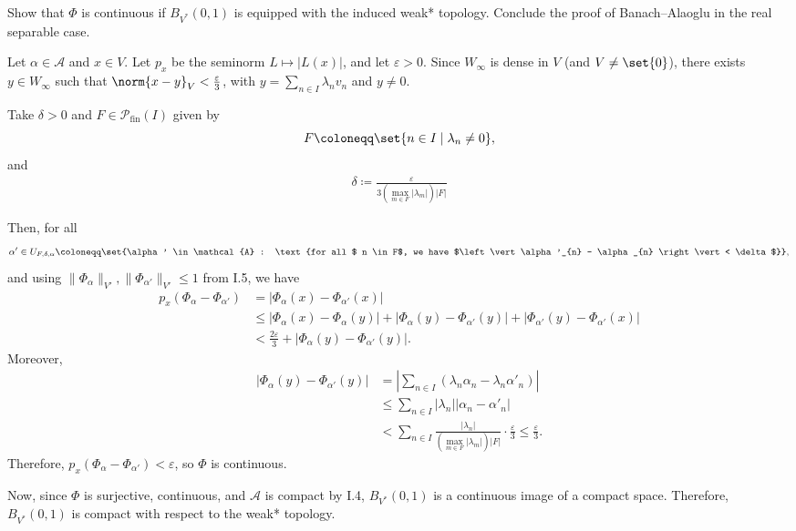\documentclass[10pt]{mypackage}
\renewcommand{\coloneq}{\coloneqq}
\begin{document}
\begin{problem}[Problem I.7]
  Show that $\Phi$ is continuous if $B_{V^{\ast}}\left( 0,1 \right)$ is equipped with the induced weak* topology. Conclude the proof of Banach--Alaoglu in the real separable case.
\end{problem}
\begin{solution}
  Let $\alpha \in \mathcal{A}$ and $x \in V$. Let $p_{x}$ be the seminorm $L \mapsto |L(x)|$, and let $\varepsilon > 0$. Since $W_{\infty}$ is dense in $V$ (and $V \neq \set{0}$), there exists $y \in W_{\infty}$ such that $\norm{x-y}_{V} < \frac{\varepsilon}{3}$, with $y = \sum_{n \in I} \lambda_{n} v_{n}$ and $y \neq 0$.

Take $\delta > 0$ and $F \in \mathcal{P}_{\mathrm{fin}}(I)$ given by
\[
F \coloneq \set{n \in I \mid \lambda_{n} \neq 0},
\]
and 
\begin{align*}
  \delta \coloneq \frac{\varepsilon}{3 \left(\max_{m \in F} |\lambda_{m}|\right) |F|}
\end{align*}

Then, for all 
\begin{align*}
  \alpha' \in U_{F,\delta,\alpha} \coloneq \set{\alpha' \in \mathcal{A} : \text{for all $ n \in F$, we have $\left\vert \alpha'_{n} - \alpha_{n} \right\vert < \delta$}},
\end{align*}
and using $\|\Phi_{\alpha}\|_{V'}, \|\Phi_{\alpha'}\|_{V'} \le 1$ from I.5, we have
\begin{align*}
p_{x}\left( \Phi_{\alpha} - \Phi_{\alpha'} \right) &= |\Phi_{\alpha}(x) - \Phi_{\alpha'}(x)| \\
&\le |\Phi_{\alpha}(x) - \Phi_{\alpha}(y)| + |\Phi_{\alpha}(y) - \Phi_{\alpha'}(y)| + |\Phi_{\alpha'}(y) - \Phi_{\alpha'}(x)| \\
&< \frac{2\varepsilon}{3} + |\Phi_{\alpha}(y) - \Phi_{\alpha'}(y)|.
\end{align*}
Moreover,
\begin{align*}
|\Phi_{\alpha}(y) - \Phi_{\alpha'}(y)| &= \left|\sum_{n \in I} (\lambda_{n} \alpha_{n} - \lambda_{n} \alpha'_{n})\right| \\
&\le \sum_{n \in I} |\lambda_{n}| |\alpha_{n} - \alpha'_{n}| \\
&< \sum_{n \in I} \frac{|\lambda_{n}|}{\left(\max_{m \in F} |\lambda_{m}|\right) |F|} \cdot \frac{\varepsilon}{3} \le \frac{\varepsilon}{3}.
\end{align*}
Therefore, $p_{x}\left( \Phi_{\alpha} - \Phi_{\alpha'} \right) < \varepsilon$, so $\Phi$ is continuous.

Now, since $\Phi$ is surjective, continuous, and $\mathcal{A}$ is compact by I.4, $B_{V^{\ast}}(0,1)$ is a continuous image of a compact space. Therefore, $B_{V^{\ast}}(0,1)$ is compact with respect to the weak* topology.
\end{solution}
\end{document}
